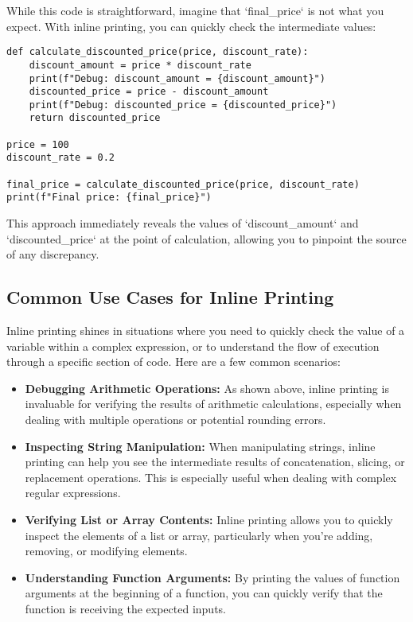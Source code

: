 \documentclass{article}
\begin{document}
{{{{While this code is straightforward, imagine that `final_price` is not what you expect. With inline printing, you can quickly check the intermediate values:

\begin{verbatim}
def calculate_discounted_price(price, discount_rate):
    discount_amount = price * discount_rate
    print(f"Debug: discount_amount = {discount_amount}")
    discounted_price = price - discount_amount
    print(f"Debug: discounted_price = {discounted_price}")
    return discounted_price

price = 100
discount_rate = 0.2

final_price = calculate_discounted_price(price, discount_rate)
print(f"Final price: {final_price}")
\end{verbatim}

This approach immediately reveals the values of `discount_amount` and `discounted_price` at the point of calculation, allowing you to pinpoint the source of any discrepancy.

\subsection*{Common Use Cases for Inline Printing}

Inline printing shines in situations where you need to quickly check the value of a variable within a complex expression, or to understand the flow of execution through a specific section of code. Here are a few common scenarios:

\begin{itemize}
    \item \textbf{Debugging Arithmetic Operations:} As shown above, inline printing is invaluable for verifying the results of arithmetic calculations, especially when dealing with multiple operations or potential rounding errors.

    \item \textbf{Inspecting String Manipulation:} When manipulating strings, inline printing can help you see the intermediate results of concatenation, slicing, or replacement operations. This is especially useful when dealing with complex regular expressions.

    \item \textbf{Verifying List or Array Contents:} Inline printing allows you to quickly inspect the elements of a list or array, particularly when you're adding, removing, or modifying elements.

    \item \textbf{Understanding Function Arguments:} By printing the values of function arguments at the beginning of a function, you can quickly verify that the function is receiving the expected inputs.


\end{itemize}}}}}
\end{document}
